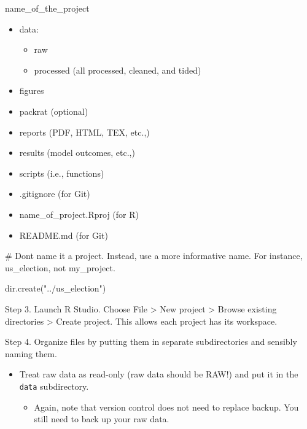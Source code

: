 \documentclass[
  letterpaper,
  DIV=11,
  numbers=noendperiod]{scrreprt}
\newenvironment{Shaded}{\begin{snugshade}}{\end{snugshade}}
\newcommand{\CommentTok}[1]{\textcolor[rgb]{0.37,0.37,0.37}{#1}}
\newcommand{\FunctionTok}[1]{\textcolor[rgb]{0.28,0.35,0.67}{#1}}
\newcommand{\NormalTok}[1]{\textcolor[rgb]{0.00,0.23,0.31}{#1}}
\newcommand{\StringTok}[1]{\textcolor[rgb]{0.13,0.47,0.30}{#1}}
\providecommand{\tightlist}{%
  \setlength{\itemsep}{0pt}\setlength{\parskip}{0pt}}\usepackage{longtable,booktabs,array}
\begin{document}
name\_of\_the\_project

\begin{itemize}
\tightlist
\item
  data:

  \begin{itemize}
  \tightlist
  \item
    raw
  \item
    processed (all processed, cleaned, and tided)
  \end{itemize}
\item
  figures
\item
  packrat (optional)
\item
  reports (PDF, HTML, TEX, etc.,)
\item
  results (model outcomes, etc.,)
\item
  scripts (i.e., functions)
\item
  .gitignore (for Git)
\item
  name\_of\_project.Rproj (for R)
\item
  README.md (for Git)
\end{itemize}

\begin{Shaded}
\begin{Highlighting}[]
\CommentTok{\# Don\textquotesingle{}t name it a project. Instead, use a more informative name. For instance, \textasciigrave{}us\_election\textasciigrave{}, not \textasciigrave{}my\_project.\textasciigrave{}}

\FunctionTok{dir.create}\NormalTok{(}\StringTok{"../us\_election"}\NormalTok{)}
\end{Highlighting}
\end{Shaded}

Step 3. Launch R Studio. Choose File \textgreater{} New project
\textgreater{} Browse existing directories \textgreater{} Create
project. This allows each project has its workspace.

Step 4. Organize files by putting them in separate subdirectories and
sensibly naming them.

\begin{itemize}
\item
  Treat raw data as read-only (raw data should be RAW!) and put it in
  the \texttt{data} subdirectory.

  \begin{itemize}
  \tightlist
  \item
    Again, note that version control does not need to replace backup.
    You still need to back up your raw data.
  \end{itemize}
\end{itemize}
\end{document}
